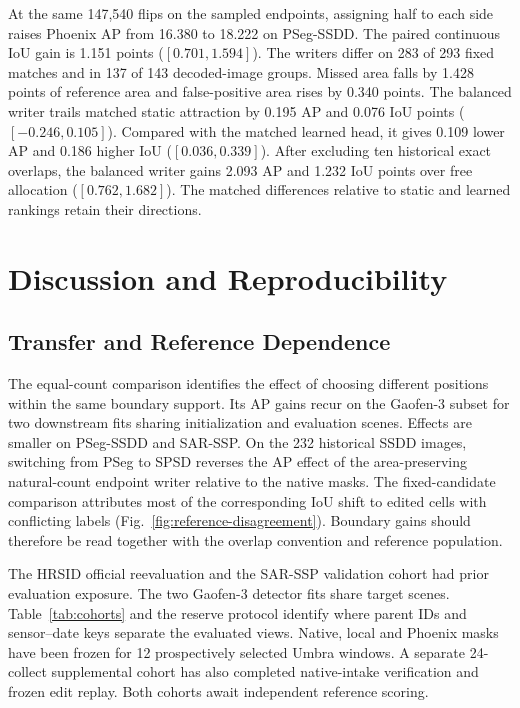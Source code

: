 \documentclass[journal]{IEEEtran}
\begin{document}
At the same 147,540 flips on the sampled endpoints, assigning half to each side raises Phoenix AP from 16.380 to 18.222 on PSeg-SSDD. The paired continuous IoU gain is 1.151 points (\([0.701,1.594]\)). The writers differ on 283 of 293 fixed matches and in 137 of 143 decoded-image groups. Missed area falls by 1.428 points of reference area and false-positive area rises by 0.340 points. The balanced writer trails matched static attraction by 0.195 AP and 0.076 IoU points (\([-0.246,0.105]\)). Compared with the matched learned head, it gives 0.109 lower AP and 0.186 higher IoU (\([0.036,0.339]\)). After excluding ten historical exact overlaps, the balanced writer gains 2.093 AP and 1.232 IoU points over free allocation (\([0.762,1.682]\)). The matched differences relative to static and learned rankings retain their directions.

\section{Discussion and Reproducibility}
\subsection{Transfer and Reference Dependence}
The equal-count comparison identifies the effect of choosing different positions within the same boundary support. Its AP gains recur on the Gaofen-3 subset for two downstream fits sharing initialization and evaluation scenes. Effects are smaller on PSeg-SSDD and SAR-SSP. On the 232 historical SSDD images, switching from PSeg to SPSD reverses the AP effect of the area-preserving natural-count endpoint writer relative to the native masks. The fixed-candidate comparison attributes most of the corresponding IoU shift to edited cells with conflicting labels (Fig.~\ref{fig:reference-disagreement}). Boundary gains should therefore be read together with the overlap convention and reference population.

The HRSID official reevaluation and the SAR-SSP validation cohort had prior evaluation exposure. The two Gaofen-3 detector fits share target scenes. Table~\ref{tab:cohorts} and the reserve protocol identify where parent IDs and sensor--date keys separate the evaluated views. Native, local and Phoenix masks have been frozen for 12 prospectively selected Umbra windows. A separate 24-collect supplemental cohort has also completed native-intake verification and frozen edit replay. Both cohorts await independent reference scoring.
\end{document}
